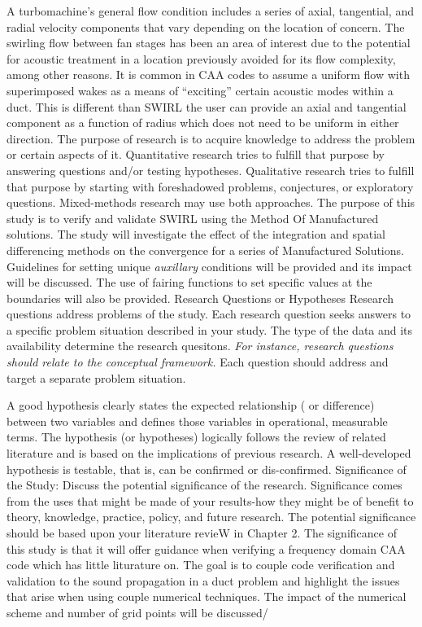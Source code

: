 \documentclass[a4paper]{report}
\begin{document}
\begin{outline}[enumerate]
    A turbomachine’s general flow condition includes a series of axial, tangential, and radial
    velocity components that vary depending on the location of concern. The swirling
    flow between fan stages has been an area of interest due to the potential for 
    acoustic treatment in a location previously avoided for its flow complexity, among other
    reasons. It is common in CAA codes to assume a uniform flow with superimposed
    wakes as a means of ``exciting'' certain acoustic modes within a duct. 
    This is different than SWIRL the user can provide an axial and tangential
    component as a function of radius which does not need to be uniform in either
    direction. 
    \1[1-C.] 
    The purpose of research is to acquire knowledge to address the problem or 
    certain aspects of it. Quantitative research tries to fulfill that purpose 
    by answering questions and/or testing hypotheses. Qualitative research 
    tries to fulfill that purpose by starting with foreshadowed problems,
    conjectures, or exploratory questions. Mixed-methods research may use both 
    approaches.
    The purpose of this study is to verify and validate SWIRL using the Method
    Of Manufactured solutions. The study will investigate the effect of the 
    integration and spatial differencing methods on the convergence for a series
    of Manufactured Solutions. Guidelines for setting unique \textit{auxillary} 
    conditions will be provided and its impact will be discussed. The use
    of fairing functions to set specific values at the boundaries will also be 
    provided. 
    \1[1-D.1] Research Questions or Hypotheses 
    Research questions address problems of the study. Each research question 
    seeks answers to a specific problem situation described in your study. 
    The type of the data and its availability determine the research quesitons.
    \textit{ For instance, research questions should relate to the conceptual 
    framework.} Each question should address and target a separate problem situation.

    A good hypothesis clearly states the expected relationship ( or difference) 
    between two variables and defines those variables in operational, measurable 
    terms. The hypothesis (or hypotheses) logically follows the review of related 
    literature and is based on the implications of previous research. A 
    well-developed hypothesis is testable, that is, can be confirmed or 
    dis-confirmed. 
    \1[1-D.2] Significance of the Study: Discuss the potential significance of
    the research. Significance comes from the uses that might be made of your
    results-how they might be of benefit to theory, knowledge, practice, policy,
    and future research. The potential significance should be based upon your
    literature revieW in Chapter 2. 
The significance of this study is that it will offer guidance when verifying a frequency
domain CAA code which has little liturature on. The goal is to couple code
verification and validation to the sound propagation in a duct problem and highlight
the issues that arise when using couple numerical techniques. The impact of 
the numerical scheme and number of grid points will be discussed/


\end{outline}
\end{document}
